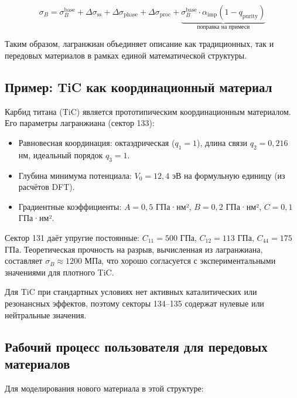 \documentclass[12pt,a4paper]{article}
\begin{document}
	\[
	\sigma_B = \sigma_B^{\mathrm{base}} + \Delta\sigma_{\mathrm{ss}} + \Delta\sigma_{\mathrm{phase}} + \Delta\sigma_{\mathrm{proc}} + \underbrace{\sigma_B^{\mathrm{base}} \cdot \alpha_{\mathrm{imp}} (1 - q_{\mathrm{purity}})}_{\text{поправка на примеси}}
	\]
	
	Таким образом, лагранжиан объединяет описание как традиционных, так и передовых материалов в рамках единой математической структуры.
	
	\subsection{Пример: TiC как координационный материал}
	\label{subsec:example-tic}
	
	Карбид титана (TiC) является прототипическим координационным материалом. Его параметры лагранжиана (сектор 133):
	
	\begin{itemize}
		\item Равновесная координация: октаэдрическая (\(q_1=1\)), длина связи \(q_2 = 0,216\) нм, идеальный порядок \(q_3=1\).
		\item Глубина минимума потенциала: \(V_0 = 12,4\) эВ на формульную единицу (из расчётов DFT).
		\item Градиентные коэффициенты: \(A=0,5\) ГПа·нм², \(B=0,2\) ГПа·нм², \(C=0,1\) ГПа·нм².
	\end{itemize}
	
	Сектор 131 даёт упругие постоянные: \(C_{11}=500\) ГПа, \(C_{12}=113\) ГПа, \(C_{44}=175\) ГПа. Теоретическая прочность на разрыв, вычисленная из лагранжиана, составляет \(\sigma_B \approx 1200\) МПа, что хорошо согласуется с экспериментальными значениями для плотного TiC.
	
	Для TiC при стандартных условиях нет активных каталитических или резонансных эффектов, поэтому секторы 134–135 содержат нулевые или нейтральные значения.
	
	\subsection{Рабочий процесс пользователя для передовых материалов}
	\label{subsec:workflow}
	
	Для моделирования нового материала в этой структуре:
	
\end{document}

